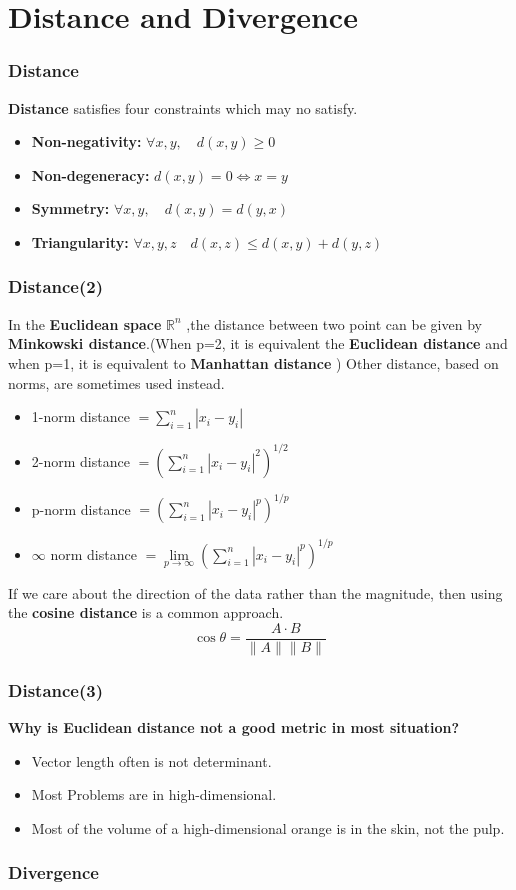 \documentclass[slidestop,compress,mathserif]{beamer}
\begin{document}
	\section{Distance and Divergence}
	\begin{frame}
		\frametitle{Distance}
		\textbf{Distance} satisfies four constraints which  may no satisfy.
		\begin{itemize}
			\item \textbf{Non-negativity:} $\forall x,y,\quad d(x,y) \ge 0$
			\item \textbf{Non-degeneracy:} $d(x,y)=0 \Leftrightarrow x=y$
			\item \textbf{Symmetry:} $\forall x,y, \quad d(x,y)=d(y,x)$
			\item \textbf{Triangularity:} $\forall x,y,z \quad d(x,z)\leq d(x,y)+d(y,z)$
		\end{itemize}
		\begin{figure}
		\end{figure}
			
	\end{frame}
		
	\begin{frame}
		\frametitle{Distance(2)}
		In the \textbf{Euclidean space} $\mathbb{R}^n$ ,the distance between two point can be given by \textbf{Minkowski distance}.(When p=2, it is equivalent the \textbf{Euclidean distance} and when p=1, it is equivalent to \textbf{Manhattan distance} ) Other distance, based on norms, are sometimes used instead.
		\begin{itemize}
			\item 1-norm distance  $= \sum_{i=1}^{n}|x_i-y_i|$
			\item 2-norm distance  $= \left(\sum_{i=1}^{n}|x_i-y_i|^2\right)^{1/2}$
			\item p-norm distance  $=  \left(\sum_{i=1}^{n}|x_i-y_i|^p\right)^{1/p}$
			\item $\infty$ norm distance $=\lim\limits_{p\rightarrow\infty}\left(\sum_{i=1}^{n}|x_i-y_i|^p\right)^{1/p}$
		\end{itemize}
		If we care about the direction of the data rather than the magnitude, then using the \textbf{cosine distance} is a common approach. 
		$$\cos \theta = \frac{A\cdot B}{\|A\|\|B\|}$$
	\end{frame}
	
	\begin{frame}
		\frametitle{Distance(3)}
		\textbf{Why is Euclidean distance not a good metric in most situation?}
		\begin{itemize}
			\item Vector length often is not determinant.
			\item Most Problems are in high-dimensional.
			\item Most of the volume of a high-dimensional orange is in the skin, not the pulp.
		\end{itemize}
		\begin{figure}
			\pgfimage[width=3cm ]{"image/30.png"}
		\end{figure}
	\end{frame}
	
	\begin{frame}
		\frametitle{Divergence}
	\end{frame}
\end{document}
